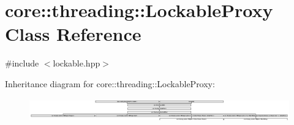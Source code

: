 \hypertarget{classcore_1_1threading_1_1_lockable_proxy}{\section{core\-:\-:threading\-:\-:Lockable\-Proxy Class Reference}
\label{classcore_1_1threading_1_1_lockable_proxy}
}


{\ttfamily \#include $<$lockable.\-hpp$>$}

Inheritance diagram for core\-:\-:threading\-:\-:Lockable\-Proxy\-:\begin{figure}[H]
\begin{center}
\leavevmode
\includegraphics[height=1.025641cm]{classcore_1_1threading_1_1_lockable_proxy}
\end{center}
\end{figure}
